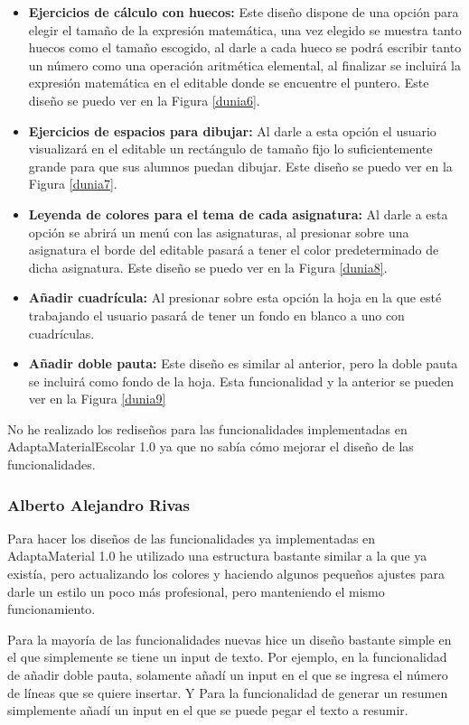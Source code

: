\begin{itemize}
  \item  \textbf{Ejercicios de cálculo con huecos:} Este diseño dispone de una opción para elegir el tamaño de la expresión matemática, una vez elegido se muestra tanto huecos como el tamaño escogido, al darle a cada hueco se podrá escribir tanto un número como una operación aritmética elemental, al finalizar se incluirá la expresión matemática en el editable donde se encuentre el puntero. Este diseño se puedo ver en la Figura \ref{dunia6}.
  \item  \textbf{Ejercicios de espacios para dibujar:} Al darle a esta opción el usuario visualizará en el editable un rectángulo de tamaño fijo lo suficientemente grande para que sus alumnos puedan dibujar. Este diseño se puedo ver en la Figura \ref{dunia7}.
  \item  \textbf{Leyenda de colores para el tema de cada asignatura:} Al darle a esta opción se abrirá un menú con las asignaturas, al presionar sobre una asignatura el borde del editable pasará a tener el color predeterminado de dicha asignatura. Este diseño se puedo ver en la Figura \ref{dunia8}.
  \item  \textbf{Añadir cuadrícula:} Al presionar sobre esta opción la hoja en la que esté trabajando el usuario pasará de tener un fondo en blanco a uno con cuadrículas.
  \item \textbf{Añadir doble pauta:} Este diseño es similar al anterior, pero la doble pauta se incluirá como fondo de la hoja. Esta funcionalidad y la anterior se pueden ver en la Figura \ref{dunia9}
\end{itemize}
No he realizado los rediseños para las funcionalidades implementadas en AdaptaMaterialEscolar 1.0  ya que no sabía cómo mejorar el diseño de las funcionalidades. 

\subsubsection{Alberto Alejandro Rivas}
Para hacer los diseños de las funcionalidades ya implementadas en AdaptaMaterial 1.0 he utilizado una estructura bastante similar a la que ya existía, pero actualizando los colores y haciendo algunos pequeños ajustes para darle un estilo un poco más profesional, pero manteniendo el mismo funcionamiento.
 
Para la mayoría de las funcionalidades nuevas hice un diseño bastante simple en el que simplemente se tiene un input de texto. Por ejemplo, en la funcionalidad de añadir doble pauta, solamente añadí un input en el que se ingresa el número de líneas que se quiere insertar. Y Para la funcionalidad de generar un resumen simplemente añadí un input en el que se puede pegar el texto a resumir. 
 
